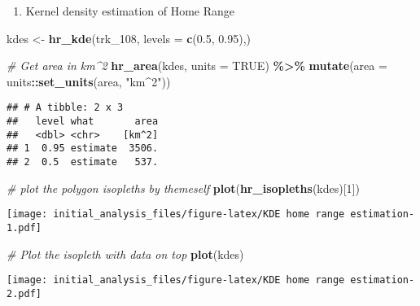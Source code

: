 \documentclass[
]{article}
\newenvironment{Shaded}{\begin{snugshade}}{\end{snugshade}}
\newcommand{\AttributeTok}[1]{\textcolor[rgb]{0.13,0.29,0.53}{#1}}
\newcommand{\CommentTok}[1]{\textcolor[rgb]{0.56,0.35,0.01}{\textit{#1}}}
\newcommand{\ConstantTok}[1]{\textcolor[rgb]{0.56,0.35,0.01}{#1}}
\newcommand{\DecValTok}[1]{\textcolor[rgb]{0.00,0.00,0.81}{#1}}
\newcommand{\FloatTok}[1]{\textcolor[rgb]{0.00,0.00,0.81}{#1}}
\newcommand{\FunctionTok}[1]{\textcolor[rgb]{0.13,0.29,0.53}{\textbf{#1}}}
\newcommand{\NormalTok}[1]{#1}
\newcommand{\OtherTok}[1]{\textcolor[rgb]{0.56,0.35,0.01}{#1}}
\newcommand{\SpecialCharTok}[1]{\textcolor[rgb]{0.81,0.36,0.00}{\textbf{#1}}}
\newcommand{\StringTok}[1]{\textcolor[rgb]{0.31,0.60,0.02}{#1}}
\providecommand{\tightlist}{%
  \setlength{\itemsep}{0pt}\setlength{\parskip}{0pt}}
\begin{document}
\begin{enumerate}
\def\labelenumi{\alph{enumi}.}
\setcounter{enumi}{1}
\tightlist
\item
  Kernel density estimation of Home Range
\end{enumerate}

\begin{Shaded}
\begin{Highlighting}[]
\NormalTok{kdes }\OtherTok{\textless{}{-}} \FunctionTok{hr\_kde}\NormalTok{(trk\_108, }\AttributeTok{levels =} \FunctionTok{c}\NormalTok{(}\FloatTok{0.5}\NormalTok{, }\FloatTok{0.95}\NormalTok{),)}

\CommentTok{\# Get area in km\^{}2}
\FunctionTok{hr\_area}\NormalTok{(kdes, }\AttributeTok{units =} \ConstantTok{TRUE}\NormalTok{) }\SpecialCharTok{\%\textgreater{}\%} 
  \FunctionTok{mutate}\NormalTok{(}\AttributeTok{area =}\NormalTok{ units}\SpecialCharTok{::}\FunctionTok{set\_units}\NormalTok{(area, }\StringTok{"km\^{}2"}\NormalTok{))}
\end{Highlighting}
\end{Shaded}

\begin{verbatim}
## # A tibble: 2 x 3
##   level what       area
##   <dbl> <chr>    [km^2]
## 1  0.95 estimate  3506.
## 2  0.5  estimate   537.
\end{verbatim}

\begin{Shaded}
\begin{Highlighting}[]
\CommentTok{\# plot the polygon isopleths by themeself}
\FunctionTok{plot}\NormalTok{(}\FunctionTok{hr\_isopleths}\NormalTok{(kdes)[}\DecValTok{1}\NormalTok{])}
\end{Highlighting}
\end{Shaded}

\texttt{[image: initial\_analysis\_files/figure-latex/KDE home range estimation-1.pdf]}

\begin{Shaded}
\begin{Highlighting}[]
\CommentTok{\# Plot the isopleth with data on top}
\FunctionTok{plot}\NormalTok{(kdes) }
\end{Highlighting}
\end{Shaded}

\texttt{[image: initial\_analysis\_files/figure-latex/KDE home range estimation-2.pdf]}
\end{document}
